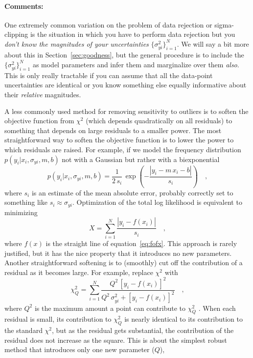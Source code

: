 \documentclass[12pt,twoside]{article}
\newcommand{\sectionname}{Section}
\newcommand{\equationname}{equation}
\newcommand{\commentsname}{Comments}
\newcounter{problem}
\newenvironment{comments}{\paragraph{\commentsname:}}{}
\newcommand{\setofall}[3]{\{{#1}\}_{{#2}}^{{#3}}}
\newcommand{\allsigmay}{\setofall{\sigma_{yi}^2}{i=1}{N}}
\begin{document}
\begin{comments}
One extremely common variation on the problem of data rejection or
sigma-clipping is the situation in which you have to perform data
rejection but you \emph{don't know the magnitudes of your
  uncertainties} $\allsigmay$.  We will say a bit more about this in
\sectionname~\ref{sec:goodness}, but the general procedure is to
include the $\allsigmay$ as model parameters and infer them and
marginalize over them \emph{also}.  This is only really tractable if
you can assume that all the data-point uncertainties are identical or
you know something else equally informative about their
\emph{relative} magnitudes.

A less commonly used method for removing sensitivity to outliers is to
soften the objective function from $\chi^2$ (which depends
quadratically on all residuals) to something that depends on large
residuals to a smaller power.  The most straightforward way to soften
the objective function is to lower the power to which residuals are
raised.  For example, if we model the frequency distribution
$p(y_i|x_i,\sigma_{yi},m,b)$ not with a Gaussian but rather with a
biexponential
\begin{equation}
p(y_i|x_i,\sigma_{yi},m,b) = \frac{1}{2\,s_i}
 \,\exp\left(-\frac{|y_i-m\,x_i-b|}{s_i}\right) \quad ,
\end{equation}
where $s_i$ is an estimate of the mean absolute error, probably
correctly set to something like $s_i\approx \sigma_{yi}$.
Optimization of the total log likelihood is equivalent to minimizing
\begin{equation}\label{eq:biexp}
X = \sum_{i=1}^N \frac{|y_i-f(x_i)|}{s_i} \quad ,
\end{equation}
where $f(x)$ is the straight line of \equationname~\ref{eq:fofx}.
This approach is rarely justified, but it has the nice
property that it introduces no new parameters.
Another straightforward softening is to (smoothly) cut off the
contribution of a residual as it becomes large.  For example, replace
$\chi^2$ with
\begin{equation}\label{eq:soft}
\chi_Q^2 = \sum_{i=1}^N \frac{Q^2\,[y_i-f(x_i)]^2}
  {Q^2\,\sigma_{yi}^2+[y_i-f(x_i)]^2} \quad ,
\end{equation}
where $Q^2$ is the maximum amount a point can contribute to $\chi_Q^2$
\citep{hampel}.  When each residual is small, its contribution to
$\chi_Q^2$ is nearly identical to its contribution to the standard
$\chi^2$, but as the residual gets substantial, the contribution of
the residual does not increase as the square.  This is about the
simplest robust method that introduces only one new parameter ($Q$),

\end{comments}
\end{document}
